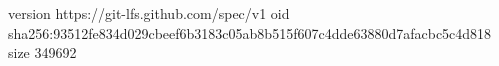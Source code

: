 version https://git-lfs.github.com/spec/v1
oid sha256:93512fe834d029cbeef6b3183c05ab8b515f607c4dde63880d7afacbc5c4d818
size 349692

